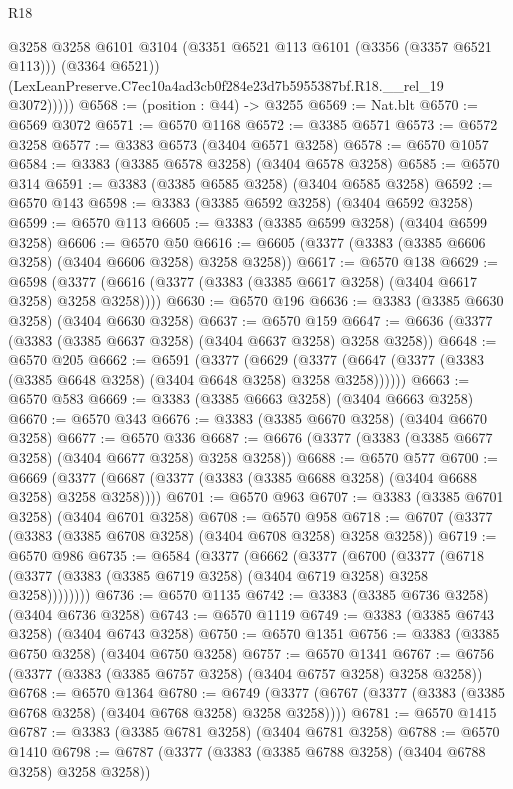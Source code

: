 \begin{lexlean}{R18}
\begin{coremodule}
              @3258
              @3258
              @6101
              @3104
              (@3351 @6521 @113 @6101 (@3356 (@3357 @6521 @113)))
              (@3364 @6521))
            (LexLeanPreserve.C7ec10a4ad3cb0f284e23d7b5955387bf.R18.__rel_19 @3072)))))
@6568 := (position : @44) -> @3255
@6569 := Nat.blt
@6570 := @6569 @3072
@6571 := @6570 @1168
@6572 := @3385 @6571
@6573 := @6572 @3258
@6577 := @3383 @6573 (@3404 @6571 @3258)
@6578 := @6570 @1057
@6584 := @3383 (@3385 @6578 @3258) (@3404 @6578 @3258)
@6585 := @6570 @314
@6591 := @3383 (@3385 @6585 @3258) (@3404 @6585 @3258)
@6592 := @6570 @143
@6598 := @3383 (@3385 @6592 @3258) (@3404 @6592 @3258)
@6599 := @6570 @113
@6605 := @3383 (@3385 @6599 @3258) (@3404 @6599 @3258)
@6606 := @6570 @50
@6616 := @6605 (@3377 (@3383 (@3385 @6606 @3258) (@3404 @6606 @3258) @3258 @3258))
@6617 := @6570 @138
@6629 := @6598 (@3377 (@6616 (@3377 (@3383 (@3385 @6617 @3258) (@3404 @6617 @3258) @3258 @3258))))
@6630 := @6570 @196
@6636 := @3383 (@3385 @6630 @3258) (@3404 @6630 @3258)
@6637 := @6570 @159
@6647 := @6636 (@3377 (@3383 (@3385 @6637 @3258) (@3404 @6637 @3258) @3258 @3258))
@6648 := @6570 @205
@6662 := @6591
    (@3377
      (@6629 (@3377 (@6647 (@3377 (@3383 (@3385 @6648 @3258) (@3404 @6648 @3258) @3258 @3258))))))
@6663 := @6570 @583
@6669 := @3383 (@3385 @6663 @3258) (@3404 @6663 @3258)
@6670 := @6570 @343
@6676 := @3383 (@3385 @6670 @3258) (@3404 @6670 @3258)
@6677 := @6570 @336
@6687 := @6676 (@3377 (@3383 (@3385 @6677 @3258) (@3404 @6677 @3258) @3258 @3258))
@6688 := @6570 @577
@6700 := @6669 (@3377 (@6687 (@3377 (@3383 (@3385 @6688 @3258) (@3404 @6688 @3258) @3258 @3258))))
@6701 := @6570 @963
@6707 := @3383 (@3385 @6701 @3258) (@3404 @6701 @3258)
@6708 := @6570 @958
@6718 := @6707 (@3377 (@3383 (@3385 @6708 @3258) (@3404 @6708 @3258) @3258 @3258))
@6719 := @6570 @986
@6735 := @6584
    (@3377
      (@6662
        (@3377
          (@6700
            (@3377 (@6718 (@3377 (@3383 (@3385 @6719 @3258) (@3404 @6719 @3258) @3258 @3258))))))))
@6736 := @6570 @1135
@6742 := @3383 (@3385 @6736 @3258) (@3404 @6736 @3258)
@6743 := @6570 @1119
@6749 := @3383 (@3385 @6743 @3258) (@3404 @6743 @3258)
@6750 := @6570 @1351
@6756 := @3383 (@3385 @6750 @3258) (@3404 @6750 @3258)
@6757 := @6570 @1341
@6767 := @6756 (@3377 (@3383 (@3385 @6757 @3258) (@3404 @6757 @3258) @3258 @3258))
@6768 := @6570 @1364
@6780 := @6749 (@3377 (@6767 (@3377 (@3383 (@3385 @6768 @3258) (@3404 @6768 @3258) @3258 @3258))))
@6781 := @6570 @1415
@6787 := @3383 (@3385 @6781 @3258) (@3404 @6781 @3258)
@6788 := @6570 @1410
@6798 := @6787 (@3377 (@3383 (@3385 @6788 @3258) (@3404 @6788 @3258) @3258 @3258))

\end{coremodule}
\end{lexlean}
